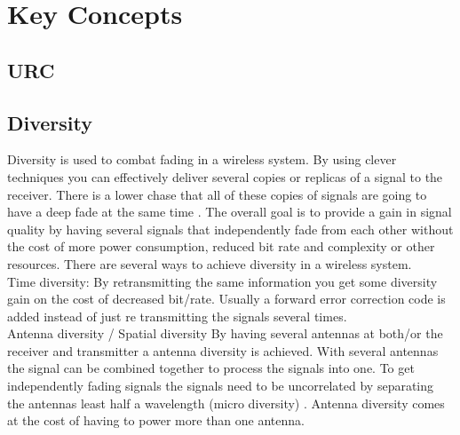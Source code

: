 \chapter{Key Concepts}
\section{URC}
\section{Diversity}
Diversity is used to combat fading in a wireless system. By using clever techniques you can effectively deliver several copies or replicas of a signal to the receiver. There is a lower chase that all of these copies of signals are going to have a deep fade at the same time \citep[p. 4-6]{diversityFuture}. The overall goal is to provide a gain in signal quality by having several signals that independently fade from each other without the cost of more power consumption, reduced bit rate and complexity or other resources. There are several ways to achieve diversity in a wireless system. \\
Time diversity: By retransmitting the same information you get some diversity gain on the cost of decreased bit/rate. Usually a forward error correction code is added instead of just re transmitting the signals several times. \\
Antenna diversity / Spatial diversity
By having several antennas at both/or the receiver and transmitter a antenna diversity is achieved. With several antennas the signal can be combined together to process the signals into one. To get independently fading signals the signals need to be uncorrelated by separating the antennas least half a wavelength (micro diversity) \citep{diversityAntenna}. Antenna diversity comes at the cost of having to power more than one antenna.


